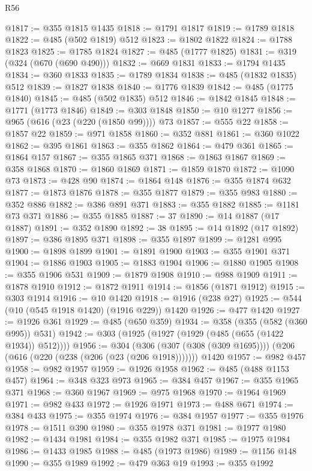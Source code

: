 \begin{lexlean}{R56}
\begin{coremodule}
@1817 := @355 @1815 @1435
@1818 := @1791 @1817
@1819 := @1789 @1818
@1822 := @485 (@502 @1819) @512
@1823 := @1802 @1822
@1824 := @1788 @1823
@1825 := @1785 @1824
@1827 := @485 (@1777 @1825)
@1831 := @319 (@324 (@670 (@690 @490)))
@1832 := @669 @1831
@1833 := @1794 @1435
@1834 := @360 @1833
@1835 := @1789 @1834
@1838 := @485 (@1832 @1835) @512
@1839 := @1827 @1838
@1840 := @1776 @1839
@1842 := @485 (@1775 @1840)
@1845 := @485 (@502 @1835) @512
@1846 := @1842 @1845
@1848 := @1771 (@1773 @1846)
@1849 := @303 @1848
@1850 := @10 @1277
@1856 := @965 (@616 (@23 (@220 (@1850 @99)))) @73
@1857 := @555 @22
@1858 := @1857 @22
@1859 := @971 @1858
@1860 := @352 @881
@1861 := @360 @1022
@1862 := @395 @1861
@1863 := @355 @1862
@1864 := @479 @361
@1865 := @1864 @157
@1867 := @355 @1865 @371
@1868 := @1863 @1867
@1869 := @358 @1868
@1870 := @1860 @1869
@1871 := @1859 @1870
@1872 := @1090 @73
@1873 := @428 @90
@1874 := @1864 @148
@1876 := @355 @1874 @632
@1877 := @1873 @1876
@1878 := @355 @1877
@1879 := @355 @983
@1880 := @352 @886
@1882 := @386 @891 @371
@1883 := @355 @1882
@1885 := @1181 @73 @371
@1886 := @355 @1885
@1887 := 37
@1890 := @14 @1887 (@17 @1887)
@1891 := @352 @1890
@1892 := 38
@1895 := @14 @1892 (@17 @1892)
@1897 := @386 @1895 @371
@1898 := @355 @1897
@1899 := @1281 @995
@1900 := @1898 @1899
@1901 := @1891 @1900
@1903 := @355 @1901 @371
@1904 := @1886 @1903
@1905 := @1883 @1904
@1906 := @1880 @1905
@1908 := @355 @1906 @531
@1909 := @1879 @1908
@1910 := @988 @1909
@1911 := @1878 @1910
@1912 := @1872 @1911
@1914 := @1856 (@1871 @1912)
@1915 := @303 @1914
@1916 := @10 @1420
@1918 := @1916 (@238 @27)
@1925 := @544 (@10 (@545 @1918 @1420) (@1916 @229)) @1420
@1926 := @477 @1420
@1927 := @1926 @361
@1929 := @485 (@650 @359)
@1934 := @358 (@355 (@582 (@360 @995)) @531)
@1942 := @303 (@1925 (@1927 (@1929 (@485 (@655 (@1422 @1934)) @512))))
@1956 := @304
    (@306 (@307 (@308 (@309 @1695))))
    (@206 (@616 (@220 (@238 (@206 (@23 (@206 @1918)))))))
    @1420
@1957 := @982 @457
@1958 := @982 @1957
@1959 := @1926 @1958
@1962 := @485 (@488 @1153 @457)
@1964 := @348 @323 @973
@1965 := @384 @457
@1967 := @355 @1965 @371
@1968 := @360 @1967
@1969 := @975 @1968
@1970 := @1964 @1969
@1971 := @982 @433
@1972 := @1926 @1971
@1973 := @488 @671
@1974 := @384 @433
@1975 := @355 @1974
@1976 := @384 @1957
@1977 := @355 @1976
@1978 := @1511 @390
@1980 := @355 @1978 @371
@1981 := @1977 @1980
@1982 := @1434 @1981
@1984 := @355 @1982 @371
@1985 := @1975 @1984
@1986 := @1433 @1985
@1988 := @485 (@1973 @1986)
@1989 := @1156 @148
@1990 := @355 @1989
@1992 := @479 @363 @19
@1993 := @355 @1992

\end{coremodule}
\end{lexlean}
